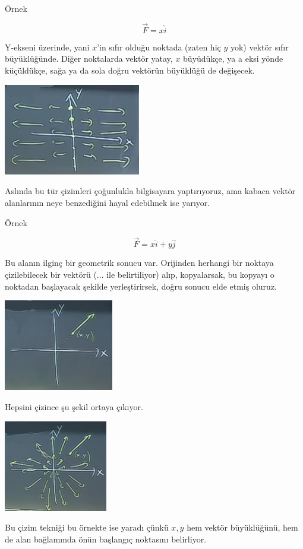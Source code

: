 \documentclass[12pt,fleqn]{article}\usepackage{../../common}
\begin{document}
Örnek

$$ \vec{F} = x\hat{i} $$

Y-ekseni üzerinde, yani $x$'in sıfır olduğu noktada (zaten hiç $y$ yok)
vektör sıfır büyüklüğünde. Diğer noktalarda vektör yatay, $x$ büyüdükçe, ya
a eksi yönde küçüldükçe, sağa ya da sola doğru vektörün büyüklüğü de
değişecek.

\includegraphics[height=4cm]{19_2.png}

Aslında bu tür çizimleri çoğunlukla bilgisayara yaptırıyoruz, ama kabaca
vektör alanlarının neye benzediğini hayal edebilmek ise yarıyor. 

Örnek

$$ \vec{F} = x\hat{i} + y\hat{j} $$

Bu alanın ilginç bir geometrik sonucu var.  Orijinden herhangi bir noktaya
çizilebilecek bir vektörü (... ile belirtiliyor) alıp, kopyalarsak, bu
kopyayı o noktadan başlayacak şekilde yerleştirirsek, doğru sonucu elde
etmiş oluruz.

\includegraphics[height=4cm]{19_3.png}

Hepsini çizince şu şekil ortaya çıkıyor. 

\includegraphics[height=4cm]{19_4.png}

Bu çizim tekniği bu örnekte ise yaradı çünkü $x,y$ hem vektör büyüklüğünü,
hem de alan bağlamında önün başlangıç noktasını belirliyor. 
\end{document}
